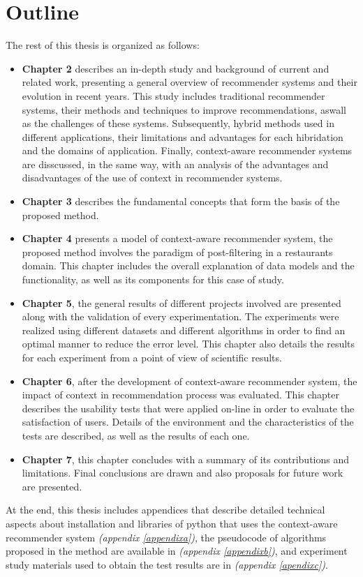 \section{Outline}

The rest of this thesis is organized as follows: 
\begin{itemize}  
\item \textbf{Chapter 2} describes an in-depth study
and background of current and related work, presenting a general
overview of recommender systems and their evolution in recent years.
This study includes traditional recommender systems, their methods
and techniques to improve recommendations, aswall as the challenges 
of these systems. Subsequently, hybrid methods used in different
applications, their limitations and advantages for each hibridation and
the domains of application. Finally, context-aware recommender systems
are disscussed, in the same way,  with an analysis of the advantages and
disadvantages of the use of context in recommender systems.
\item \textbf{Chapter 3} describes the fundamental
concepts that form the basis of the proposed method.
\item \textbf{Chapter 4} presents a model of context-aware
recommender system, the proposed method involves the paradigm of
post-filtering in a restaurants domain. This chapter includes the
overall explanation of data models and  the functionality, as
well as its components for this case of study.
\item \textbf {Chapter 5}, the general results of different
projects involved are presented along with the validation of every
experimentation. The experiments were realized using different
datasets and different algorithms in order to find an optimal manner
to reduce the error level. This chapter also details the results for
each experiment from a point of view of scientific results.
\item \textbf {Chapter 6}, after the development of
context-aware recommender system, the impact of
context in recommendation process was evaluated. 
This chapter describes the
usability tests that were applied on-line in order to evaluate the
satisfaction of users. Details of the environment and the
characteristics of the tests are described, as well as 
the results of each one.
\item \textbf {Chapter 7}, this chapter concludes with a
summary of its contributions and limitations. Final
conclusions are drawn and also proposals for future work are presented.
\end{itemize}  
At the end, this thesis includes appendices that describe
detailed technical aspects about installation and libraries of python
that uses the context-aware recommender system  \textit{(appendix \ref{appendixa})}, 
the pseudocode of algorithms proposed in the method are available in  \textit{(appendix \ref{appendixb})}, 
and experiment study materials used to obtain the test results are in  \textit{(appendix \ref{apendixc})}.
